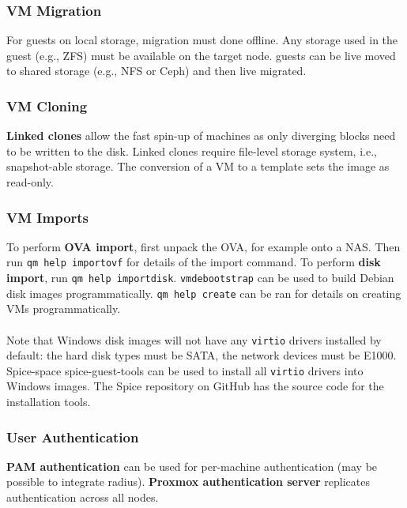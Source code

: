 \documentclass[a4paper,11pt]{article}
\begin{document}
\subsubsection{VM Migration}
For guests on local storage, migration must done offline.
Any storage used in the guest (e.g., ZFS) must be available on the target node.
guests can be live moved to shared storage (e.g., NFS or Ceph) and then live migrated.

\subsubsection{VM Cloning}
\textbf{Linked clones} allow the fast spin-up of machines as only diverging blocks need to be written to the disk.
Linked clones require file-level storage system, i.e., snapshot-able storage.
The conversion of a VM to a template sets the image as read-only.

\subsubsection{VM Imports}
To perform \textbf{OVA import}, first unpack the OVA, for example onto a NAS.
Then run \verb|qm help importovf| for details of the import command.
To perform \textbf{disk import}, run \verb|qm help importdisk|.
\verb|vmdebootstrap| can be used to build Debian disk images programmatically.
\verb|qm help create| can be ran for details on creating VMs programmatically.
\\\\
Note that Windows disk images will not have any \verb|virtio| drivers installed by default:
the hard disk types must be SATA, the network devices must be E1000.
Spice-space spice-guest-tools can be used to install all \verb|virtio| drivers into Windows images.
The Spice repository on GitHub has the source code for the installation tools.

\subsubsection{User Authentication}
\textbf{PAM authentication} can be used for per-machine authentication (may be possible to integrate radius).
\textbf{Proxmox authentication server} replicates authentication across all nodes.
\end{document}
